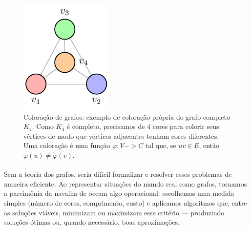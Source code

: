 \documentclass[12pt,a4paper]{article}
\def\to{->}%
\begin{document}
\begin{figure}[H]
    \centering
    \includegraphics[width=0.9\linewidth]{figures/fig_coloracao.pdf}

    \caption{Coloração de grafos: exemplo de coloração própria do grafo completo $K_4$. Como $K_4$ é completo, precisamos de 4 cores para colorir seus vértices de modo que vértices adjacentes tenham cores diferentes. Uma coloração é uma função $\varphi:V\to C$ tal que, se $uv\in E$, então $\varphi(u)\neq\varphi(v)$.}
    \label{fig:coloracao}\end{figure}


\paragraph{}
Sem a teoria dos grafos, seria difícil formalizar e resolver esses problemas de maneira eficiente. Ao representar situações do mundo real como grafos, tornamos a parcimônia da navalha de occam algo operacional: escolhemos uma medida simples (número de cores, comprimento, custo) e aplicamos algoritmos que, entre as soluções viáveis, minimizam ou maximizam esse critério — produzindo soluções ótimas ou, quando necessário, boas aproximações.
\end{document}
